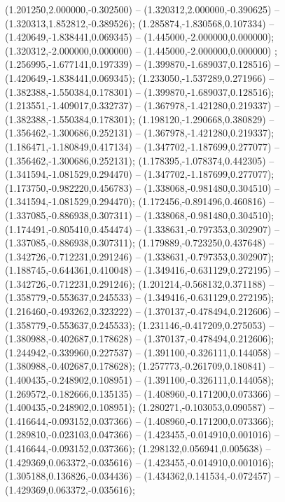  (1.201250,2.000000,-0.302500) -- (1.320312,2.000000,-0.390625) -- (1.320313,1.852812,-0.389526);
 (1.285874,-1.830568,0.107334) -- (1.420649,-1.838441,0.069345) -- (1.445000,-2.000000,0.000000);
 (1.320312,-2.000000,0.000000) -- (1.445000,-2.000000,0.000000) ;
 (1.256995,-1.677141,0.197339) -- (1.399870,-1.689037,0.128516) -- (1.420649,-1.838441,0.069345);
 (1.233050,-1.537289,0.271966) -- (1.382388,-1.550384,0.178301) -- (1.399870,-1.689037,0.128516);
 (1.213551,-1.409017,0.332737) -- (1.367978,-1.421280,0.219337) -- (1.382388,-1.550384,0.178301);
 (1.198120,-1.290668,0.380829) -- (1.356462,-1.300686,0.252131) -- (1.367978,-1.421280,0.219337);
 (1.186471,-1.180849,0.417134) -- (1.347702,-1.187699,0.277077) -- (1.356462,-1.300686,0.252131);
 (1.178395,-1.078374,0.442305) -- (1.341594,-1.081529,0.294470) -- (1.347702,-1.187699,0.277077);
 (1.173750,-0.982220,0.456783) -- (1.338068,-0.981480,0.304510) -- (1.341594,-1.081529,0.294470);
 (1.172456,-0.891496,0.460816) -- (1.337085,-0.886938,0.307311) -- (1.338068,-0.981480,0.304510);
 (1.174491,-0.805410,0.454474) -- (1.338631,-0.797353,0.302907) -- (1.337085,-0.886938,0.307311);
 (1.179889,-0.723250,0.437648) -- (1.342726,-0.712231,0.291246) -- (1.338631,-0.797353,0.302907);
 (1.188745,-0.644361,0.410048) -- (1.349416,-0.631129,0.272195) -- (1.342726,-0.712231,0.291246);
 (1.201214,-0.568132,0.371188) -- (1.358779,-0.553637,0.245533) -- (1.349416,-0.631129,0.272195);
 (1.216460,-0.493262,0.323222) -- (1.370137,-0.478494,0.212606) -- (1.358779,-0.553637,0.245533);
 (1.231146,-0.417209,0.275053) -- (1.380988,-0.402687,0.178628) -- (1.370137,-0.478494,0.212606);
 (1.244942,-0.339960,0.227537) -- (1.391100,-0.326111,0.144058) -- (1.380988,-0.402687,0.178628);
 (1.257773,-0.261709,0.180841) -- (1.400435,-0.248902,0.108951) -- (1.391100,-0.326111,0.144058);
 (1.269572,-0.182666,0.135135) -- (1.408960,-0.171200,0.073366) -- (1.400435,-0.248902,0.108951);
 (1.280271,-0.103053,0.090587) -- (1.416644,-0.093152,0.037366) -- (1.408960,-0.171200,0.073366);
 (1.289810,-0.023103,0.047366) -- (1.423455,-0.014910,0.001016) -- (1.416644,-0.093152,0.037366);
 (1.298132,0.056941,0.005638) -- (1.429369,0.063372,-0.035616) -- (1.423455,-0.014910,0.001016);
 (1.305188,0.136826,-0.034436) -- (1.434362,0.141534,-0.072457) -- (1.429369,0.063372,-0.035616);

